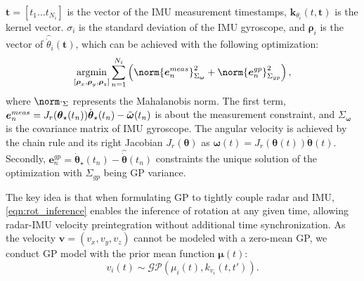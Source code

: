 $\mathbf{t}=[t_1\dots t_{N_i}]$ is the vector of the \ac{IMU} measurement timestamps,
$\mathbf{k}_{\theta_i}(t,\mathbf{t})$ is the kernel vector.
$\sigma_i$ is the standard deviation of the \ac{IMU} gyroscope, and $\boldsymbol{\rho}_i$ is the vector of $\hat{\dot{\theta}}_i(\mathbf{t})$, which can be achieved with the following optimization:
\vspace{-1mm}
\begin{equation}
    \displaystyle \argmin_{[\boldsymbol{\rho}_x, \boldsymbol{\rho}_y, \boldsymbol{\rho}_z]}\sum_{n=1}^{N_i} \left( \norm{\boldsymbol{e}_n^{meas}}_{\Sigma_{\boldsymbol{\omega}}}^2+\norm{\boldsymbol{e}_n^{gp}}_{\Sigma_{gp}}^2 \right),
\end{equation}
where $\norm\cdot_\Sigma$ represents the Mahalanobis norm.
The first term, $\boldsymbol{e}_n^{meas} = J_r(\boldsymbol{\theta}_\star(t_n))\dot{\boldsymbol{\theta}}_\star(t_n)-\Tilde{\boldsymbol{\omega}}(t_n)$ is about the measurement constraint, and $\Sigma_{\boldsymbol{\omega}}$ is the covariance matrix of \ac{IMU} gyroscope. The angular velocity is achieved by the chain rule and its right Jacobian $J_r(\boldsymbol{\theta})$ as $\boldsymbol{\omega}(t) = J_r(\boldsymbol{\theta}(t))\dot{\boldsymbol{\theta}}(t)$.
Secondly, $\boldsymbol{e}_n^{gp}=\dot{\boldsymbol{\theta}}_{\star}(t_n)-\hat{\dot{\boldsymbol{\theta}}}(t_n)$ constraints the unique solution of the optimization with $\Sigma_{gp}$ being \ac{GP} variance.

The key idea is that when formulating \ac{GP} to tightly couple radar and \ac{IMU}, \eqref{eqn:rot_inference} enables the inference of rotation at any given time, allowing radar-\ac{IMU} velocity preintegration without additional time synchronization.
As the velocity $\mathbf{v}=(v_x,v_y,v_z)$ cannot be modeled with a zero-mean \ac{GP}, we conduct \ac{GP} model with the prior mean function $\boldsymbol{\mu}(t)$:
\vspace{-1mm}
\begin{equation}
    {v}_i(t)\sim\mathcal{GP}(\mu_i(t),k_{v_i}(t,t')).
\end{equation}

